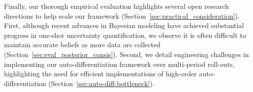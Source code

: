 Finally, our thorough empirical evaluation highlights several open
research directions   to help scale our framework (Section~\ref{sec:practical_consideration}). 
First, although recent
advances in Bayesian modeling have achieved substantial progress in one-shot
uncertainty quantification, we observe it is often difficult
to maintain accurate beliefs as more data are collected (Section~\ref{sec:eval_posterior_consis}).
Second, we detail
engineering challenges in implementing our auto-differentiation framework over
multi-period roll-outs, highlighting the need for efficient implementations of
high-order auto-differentiation (Section~\ref{sec:auto-diff-bottleneck}). 


 

 





